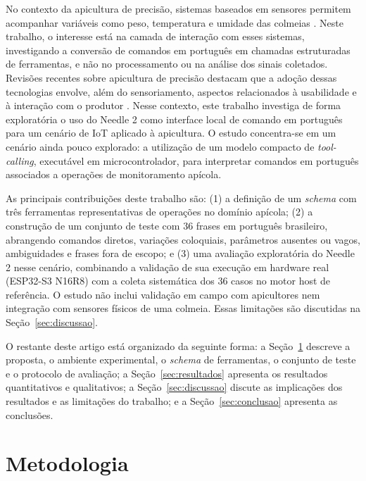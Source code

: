 \documentclass[12pt]{article}
\begin{document}
No contexto da apicultura de precisão, sistemas baseados em sensores
permitem acompanhar variáveis como peso, temperatura e umidade das
colmeias \cite{henry2019precision,meikle2015application,danieli2024precision}.
Neste trabalho, o interesse está na camada de interação com esses sistemas, investigando a conversão de comandos em português em chamadas estruturadas de ferramentas, e não no processamento ou na análise dos sinais coletados. Revisões recentes sobre apicultura de precisão destacam que a adoção dessas tecnologias envolve, além do sensoriamento, aspectos relacionados à usabilidade e à interação com o produtor \cite{danieli2024precision}. Nesse contexto, este trabalho investiga de forma exploratória o uso do Needle 2 como interface local de comando em português para um cenário de IoT aplicado à apicultura. O estudo concentra-se em um cenário ainda pouco explorado: a utilização de um modelo compacto de \textit{tool-calling}, executável em microcontrolador, para interpretar comandos em português associados a operações de monitoramento apícola.

As principais contribuições deste trabalho são: (1) a definição de um
\textit{schema} com três ferramentas representativas de operações no
domínio apícola; (2) a construção de um conjunto de teste com 36 frases
em português brasileiro, abrangendo comandos diretos, variações
coloquiais, parâmetros ausentes ou vagos, ambiguidades e frases fora de
escopo; e (3) uma avaliação exploratória do Needle 2 nesse cenário,
combinando a validação de sua execução em hardware real (ESP32-S3 N16R8)
com a coleta sistemática dos 36 casos no motor host de referência. O
estudo não inclui validação em campo com apicultores nem integração com
sensores físicos de uma colmeia. Essas limitações são discutidas na
Seção~\ref{sec:discussao}.

O restante deste artigo está organizado da seguinte forma:
a Seção~\ref{sec:metodologia} descreve a proposta, o ambiente experimental, o \textit{schema} de ferramentas, o conjunto de teste e o protocolo de avaliação; a Seção~\ref{sec:resultados} apresenta os resultados quantitativos e qualitativos; a Seção~\ref{sec:discussao} discute as implicações dos resultados e as limitações do trabalho; e a
Seção~\ref{sec:conclusao} apresenta as conclusões.

\section{Metodologia}
\label{sec:metodologia}
\end{document}
